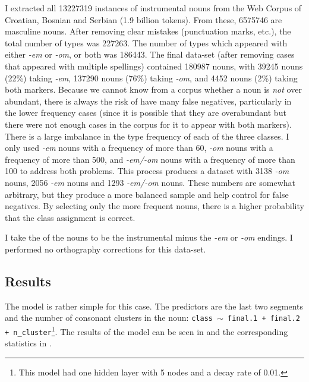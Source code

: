 I extracted all 13227319 instances of instrumental  nouns from the Web Corpus of Croatian, Bosnian and Serbian \autocite{ljubesic14-bs} (1.9 billion tokens). From these, 6575746 are masculine nouns. After removing clear mistakes (punctuation marks, etc.), the total  number of types was 227263. The number of types which appeared with either \textit{-em} or \textit{-om}, or both was 186443. The final data-set (after removing cases that appeared with multiple spellings) contained 180987 nouns, with 39245 nouns (22\%) taking \textit{-em}, 137290 nouns (76\%) taking \textit{-om}, and 4452 nouns (2\%) taking both markers. Because we cannot know from a corpus whether a noun is \textit{not} over abundant, there is always the risk of have many false negatives, particularly in the lower frequency cases (since it is possible that they are overabundant but there were not enough cases in the corpus for it to appear with both markers). There is a large imbalance in the type frequency of each of the three classes. I only used \textit{-em} nouns with a frequency of more than 60, \textit{-om} nouns with a frequency of more than 500, and \textit{-em/-om} nouns with a frequency of more than 100 to address both problems. This process produces a dataset with 3138 \textit{-om} nouns, 2056 \textit{-em} nouns and 1293 \textit{-em/-om} nouns. These numbers are somewhat arbitrary, but they produce a more balanced sample and help control for false negatives. By selecting only the more frequent nouns, there is a higher probability that the class assignment is correct.

I take the  of the nouns to be the instrumental  minus the \textit{-em} or \textit{-om} endings. I performed no orthography corrections for this data-set.

\subsection{Results}

\largerpage[2]
The model is rather simple for this case. The predictors are the last two segments and the number of consonant clusters in the noun: \texttt{class $\sim$ final.1 + final.2 + n\_cluster}\footnote{This model had one hidden layer with 5 nodes and a decay rate of 0.01.}. The results of the model can be seen in  and the corresponding statistics in .

